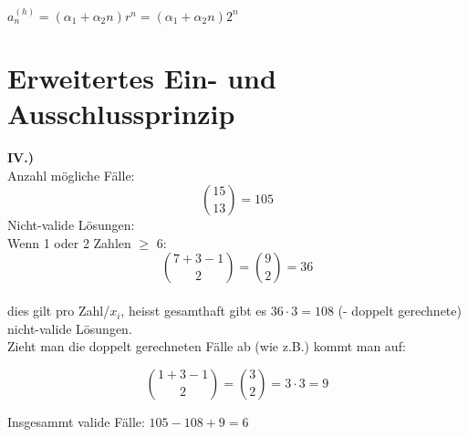 \documentclass[12pt]{scrartcl}
\begin{document}
$a_n^{(h)} = (\alpha_1 + \alpha_2 n) r^n = (\alpha_1 + \alpha_2n)2^n$

\newpage
\section{Erweitertes Ein- und Ausschlussprinzip}
\textbf{IV.)}\\
Anzahl mögliche Fälle: 
\[\binom{15}{13} = 105\]
Nicht-valide Lösungen:\\
Wenn 1 oder 2 Zahlen $\geq$ 6:
\[\binom{7 + 3 - 1}{2} = \binom{9}{2} = 36\]\\
dies gilt pro Zahl/$x_i$, heisst gesamthaft gibt es $36 \cdot 3 = 108$ (- doppelt gerechnete) nicht-valide Lösungen.\\

Zieht man die doppelt gerechneten Fälle ab (wie z.B.) kommt man auf:

\[\binom{1+3-1}{2} = \binom{3}{2} = 3 \cdot 3 = 9\]

Insgesammt valide Fälle: $105 - 108 + 9 = 6$\\






% 
\end{document}
